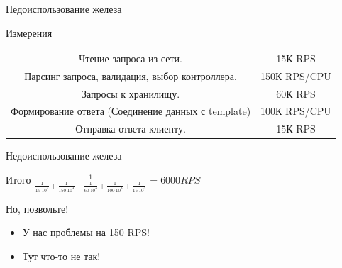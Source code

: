 \documentclass[aspectratio=169]{beamer}
\begin{document}
\begin{frame}{Недоиспользование железа}
    \begin{block}{Измерения}
        \begin{tabular}{ c c }

            \pause Чтение запроса из сети. & 15К RPS  \\
            \pause Парсинг запроса, валидация, выбор контроллера. & 150К RPS/CPU  \\
            \pause Запросы к хранилищу. & 60К RPS \\
            \pause Формирование ответа (Соединение данных с template) & 100К RPS/CPU \\
            \pause Отправка ответа клиенту. & 15К RPS \\

        \end{tabular}
    \end{block}
\end{frame}
    

\begin{frame}{Недоиспользование железа}
    \begin{block}{Итого}
        {\huge
            $\frac{1}{\frac{1}{15 \ 10^3} + \frac{1}{150 \ 10^3} + \frac{1}{60 \ 10^3}+\frac{1}{100 \ 10^3}+\frac{1}{15 \ 10^3}} = 6000 RPS$
        }
    \end{block}

    \pause
    \begin{block}{Но, позвольте!}
        \begin{itemize}
            \pause\item У нас проблемы на 150 RPS!
            \pause\item Тут что-то не так!
        \end{itemize}
    \end{block}
\end{frame}
\end{document}
